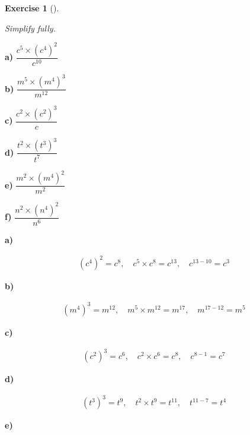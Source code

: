 \documentclass[
  letterpaper,
  DIV=11,
  numbers=noendperiod]{scrreprt}
\theoremstyle{definition}
\newtheorem{exercise}{Exercise}[chapter]
\theoremstyle{remark}
\begin{document}
\begin{exercise}[]\protect\hypertarget{exr-u2-25}{}\label{exr-u2-25}

\emph{Simplify fully.}

\textbf{a)} \(\displaystyle \dfrac{c^{5} \times (c^{4})^{2}}{c^{10}}\)

\textbf{b)} \(\displaystyle \dfrac{m^{5} \times (m^{4})^{3}}{m^{12}}\)

\textbf{c)} \(\displaystyle \dfrac{c^{2} \times (c^{2})^{3}}{c}\)

\textbf{d)} \(\displaystyle \dfrac{t^{2} \times (t^{3})^{3}}{t^{7}}\)

\textbf{e)} \(\displaystyle \dfrac{m^{2} \times (m^{4})^{2}}{m^{2}}\)

\textbf{f)} \(\displaystyle \dfrac{n^{2} \times (n^{4})^{2}}{n^{6}}\)

\begin{tcolorbox}[enhanced jigsaw, opacitybacktitle=0.6, coltitle=black, arc=.35mm, colframe=quarto-callout-tip-color-frame, colback=white, bottomrule=.15mm, left=2mm, colbacktitle=quarto-callout-tip-color!10!white, titlerule=0mm, opacityback=0, title=\textcolor{quarto-callout-tip-color}{\faLightbulb}\hspace{0.5em}{🔍 View Solutions}, leftrule=.75mm, breakable, rightrule=.15mm, bottomtitle=1mm, toptitle=1mm, toprule=.15mm]

\textbf{a)}

\[
\begin{aligned}
(c^{4})^{2}=c^{8},\quad c^{5}\times c^{8}=c^{13},\quad c^{13-10}=c^{3}
\end{aligned}
\]

\textbf{b)}

\[
\begin{aligned}
(m^{4})^{3}=m^{12},\quad m^{5}\times m^{12}=m^{17},\quad m^{17-12}=m^{5}
\end{aligned}
\]

\textbf{c)}

\[
\begin{aligned}
(c^{2})^{3}=c^{6},\quad c^{2}\times c^{6}=c^{8},\quad c^{8-1}=c^{7}
\end{aligned}
\]

\textbf{d)}

\[
\begin{aligned}
(t^{3})^{3}=t^{9},\quad t^{2}\times t^{9}=t^{11},\quad t^{11-7}=t^{4}
\end{aligned}
\]

\textbf{e)}


\end{tcolorbox}
\end{exercise}
\end{document}
